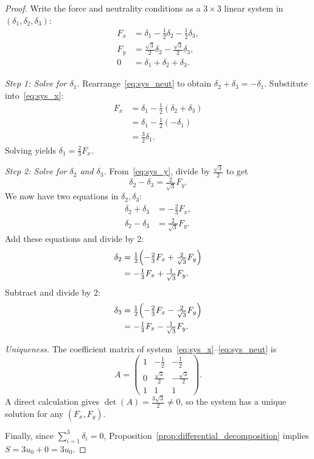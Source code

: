 \documentclass{article}
\begin{document}
\begin{proof}
Write the force and neutrality conditions as a $3 \times 3$ linear system in 
$(\delta_1, \delta_2, \delta_3)$:
\begin{align}
F_x &= \delta_1 - \tfrac{1}{2}\delta_2 - \tfrac{1}{2}\delta_3, \label{eq:sys_x} \\
F_y &= \tfrac{\sqrt{3}}{2}\delta_2 - \tfrac{\sqrt{3}}{2}\delta_3, \label{eq:sys_y} \\
0   &= \delta_1 + \delta_2 + \delta_3. \label{eq:sys_neut}
\end{align}

\emph{Step 1: Solve for $\delta_1$.}
Rearrange~\eqref{eq:sys_neut} to obtain $\delta_2 + \delta_3 = -\delta_1$. 
Substitute into~\eqref{eq:sys_x}:
\[
\begin{aligned}
F_x &= \delta_1 - \tfrac{1}{2}(\delta_2 + \delta_3) \\
    &= \delta_1 - \tfrac{1}{2}(-\delta_1) \\
    &= \tfrac{3}{2}\delta_1.
\end{aligned}
\]
Solving yields $\delta_1 = \tfrac{2}{3} F_x$.

\emph{Step 2: Solve for $\delta_2$ and $\delta_3$.}
From~\eqref{eq:sys_y}, divide by $\tfrac{\sqrt{3}}{2}$ to get
\[
\delta_2 - \delta_3 = \tfrac{2}{\sqrt{3}} F_y.
\]
We now have two equations in $\delta_2, \delta_3$:
\[
\begin{aligned}
\delta_2 + \delta_3 &= -\tfrac{2}{3} F_x, \\
\delta_2 - \delta_3 &= \tfrac{2}{\sqrt{3}} F_y.
\end{aligned}
\]
Add these equations and divide by 2:
\[
\begin{aligned}
\delta_2 &= \tfrac{1}{2}\Bigl(-\tfrac{2}{3} F_x + \tfrac{2}{\sqrt{3}} F_y\Bigr) \\
         &= -\tfrac{1}{3} F_x + \tfrac{1}{\sqrt{3}} F_y.
\end{aligned}
\]
Subtract and divide by 2:
\[
\begin{aligned}
\delta_3 &= \tfrac{1}{2}\Bigl(-\tfrac{2}{3} F_x - \tfrac{2}{\sqrt{3}} F_y\Bigr) \\
         &= -\tfrac{1}{3} F_x - \tfrac{1}{\sqrt{3}} F_y.
\end{aligned}
\]

\emph{Uniqueness.}
The coefficient matrix of system~\eqref{eq:sys_x}--\eqref{eq:sys_neut} is
\[
A = \begin{pmatrix}
1 & -\tfrac{1}{2} & -\tfrac{1}{2} \\[2pt]
0 & \tfrac{\sqrt{3}}{2} & -\tfrac{\sqrt{3}}{2} \\[2pt]
1 & 1 & 1
\end{pmatrix}.
\]
A direct calculation gives $\det(A) = \tfrac{3\sqrt{3}}{2} \neq 0$, so the system has a unique 
solution for any $(F_x, F_y)$.

Finally, since $\sum_{i=1}^{3} \delta_i = 0$, Proposition~\ref{prop:differential_decomposition} 
implies $S = 3u_0 + 0 = 3u_0$.
\end{proof}
\end{document}
